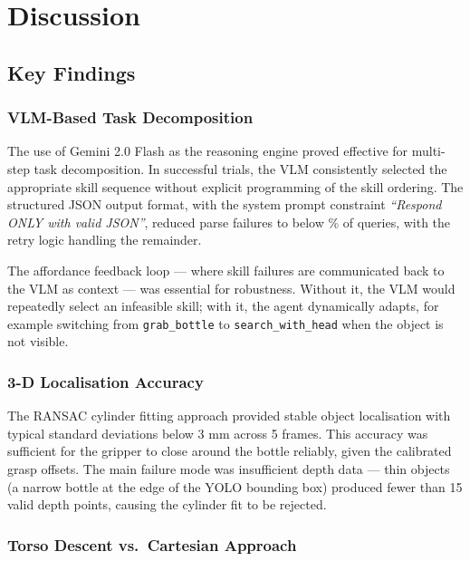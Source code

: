 \chapter{Discussion}
\label{ch:discussion}

\section{Key Findings}

\subsection{VLM-Based Task Decomposition}

The use of Gemini 2.0 Flash as the reasoning engine proved effective for multi-step
task decomposition.
In successful trials, the VLM consistently selected the appropriate skill sequence
without explicit programming of the skill ordering.
The structured JSON output format, with the system prompt constraint
\textit{``Respond ONLY with valid JSON''}, reduced parse failures to below \%
of queries, with the retry logic handling the remainder.

The affordance feedback loop — where skill failures are communicated back to the
VLM as context — was essential for robustness.
Without it, the VLM would repeatedly select an infeasible skill; with it, the agent
dynamically adapts, for example switching from \texttt{grab\_bottle} to
\texttt{search\_with\_head} when the object is not visible.

\subsection{3-D Localisation Accuracy}

The RANSAC cylinder fitting approach provided stable object localisation with typical
standard deviations below 3 mm across 5 frames.
This accuracy was sufficient for the gripper to close around the bottle reliably,
given the calibrated grasp offsets.
The main failure mode was insufficient depth data — thin objects (\eg a narrow bottle
at the edge of the YOLO bounding box) produced fewer than 15 valid depth points,
causing the cylinder fit to be rejected.

\subsection{Torso Descent vs.\ Cartesian Approach}

